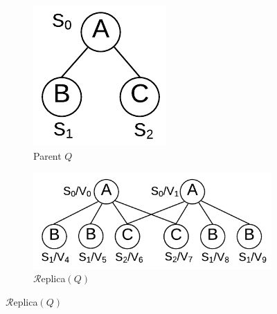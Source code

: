 \begin{figure}[t]
    \begin{subfigure}[b]{0.15\textwidth}
            \hspace{4mm}\includegraphics[scale=0.5]{img_ex/patternQ.pdf}
            \caption{Parent $Q$}
			\label{fig:exact-Q}
    \end{subfigure}%
    \hspace*{\fill}
	\begin{subfigure}[b]{0.3\textwidth}
            \hspace{-2.5mm}\includegraphics[scale=0.5]{img_ex/replicaQ.pdf}
            \caption{$\mathcal{R}$eplica$(Q)$}
			\label{fig:exact-REPQ}
	\end{subfigure}


\end{figure}
